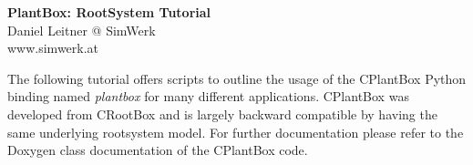 \documentclass[a4paper]{article}
\begin{document}
\begin{center}
\vspace{0.5 cm}
\huge{\textbf{PlantBox: RootSystem Tutorial}} \\
\vspace{0.5 cm}
\normalsize
Daniel Leitner @ SimWerk \\
www.simwerk.at 
\end{center}

\vspace{0.5 cm}

\noindent 
The following tutorial offers scripts to outline the usage of the CPlantBox \citep{zhou2020cplantbox} Python binding named \emph{plantbox} for many different applications. CPlantBox was developed from CRootBox \citep{schnepf2018crootbox} and is largely backward compatible by having the same underlying rootsystem model. For further documentation please refer to the Doxygen class documentation of the CPlantBox code.
 

\vspace{0.5 cm}

\tableofcontents

\newpage







 









\newpage

 
\end{document}
